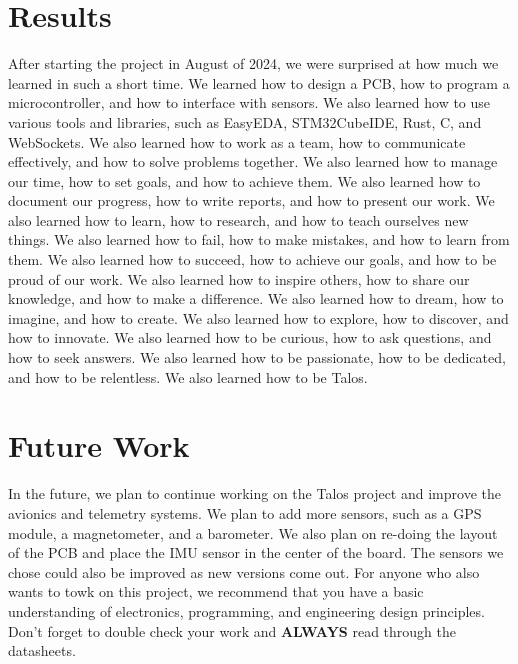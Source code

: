 \documentclass{article}
\begin{document}
\section{Results}
After starting the project in August of 2024, we were surprised at how much we learned in such a short time. We learned how to design a PCB, how to program a microcontroller, and how to interface with sensors. We also learned how to use various tools and libraries, such as EasyEDA, STM32CubeIDE, Rust, C, and WebSockets. We also learned how to work as a team, how to communicate effectively, and how to solve problems together. We also learned how to manage our time, how to set goals, and how to achieve them. We also learned how to document our progress, how to write reports, and how to present our work. We also learned how to learn, how to research, and how to teach ourselves new things. We also learned how to fail, how to make mistakes, and how to learn from them. We also learned how to succeed, how to achieve our goals, and how to be proud of our work. We also learned how to inspire others, how to share our knowledge, and how to make a difference. We also learned how to dream, how to imagine, and how to create. We also learned how to explore, how to discover, and how to innovate. We also learned how to be curious, how to ask questions, and how to seek answers. We also learned how to be passionate, how to be dedicated, and how to be relentless. We also learned how to be Talos.

\section{Future Work}
In the future, we plan to continue working on the Talos project and improve the avionics and telemetry systems. We plan to add more sensors, such as a GPS module, a magnetometer, and a barometer. We also plan on re-doing the layout of the PCB and place the IMU sensor in the center of the board. The sensors we chose could also be improved as new versions come out. For anyone who also wants to towk on this project, we recommend that you have a basic understanding of electronics, programming, and engineering design principles. Don't forget to double check your work and \textbf{ALWAYS} read through the datasheets.
\printbibliography
\end{document}
